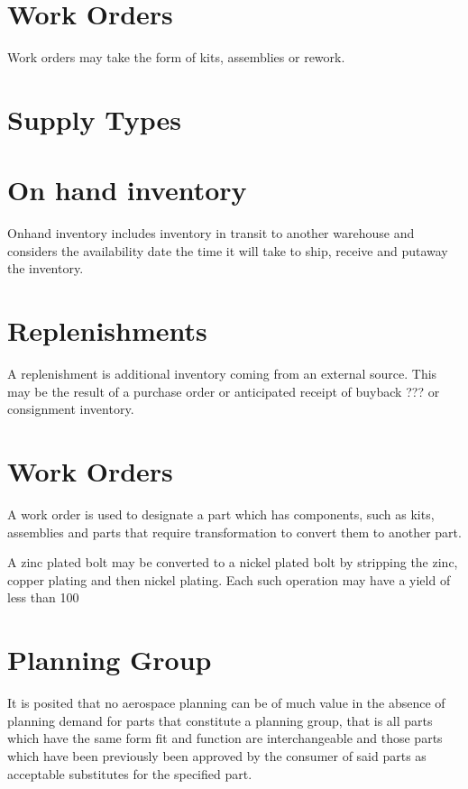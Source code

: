\documentclass[letterpaper,10pt,english]{sphinxmanual}
\begin{document}
\section{Work Orders}
\label{APS/ApsFeatures:work-orders}
Work orders may take the form of kits, assemblies or rework.


\section{Supply Types}
\label{APS/ApsFeatures:supply-types}

\section{On hand inventory}
\label{APS/ApsFeatures:on-hand-inventory}
Onhand inventory includes inventory in transit to another warehouse and
considers the availability date the time it will take to ship, receive
and putaway the inventory.


\section{Replenishments}
\label{APS/ApsFeatures:replenishments}
A replenishment is additional inventory coming from an external source.
This may be the result of a purchase order or anticipated receipt of
buyback ??? or consignment inventory.


\section{Work Orders}
\label{APS/ApsFeatures:id2}
A work order is used to designate a part which has components, such as
kits, assemblies and parts that require transformation to convert them
to another part.

A zinc plated bolt may be converted to a nickel plated bolt by stripping
the zinc, copper plating and then nickel plating. Each such operation
may have a yield of less than 100


\section{Planning Group}
\label{APS/ApsFeatures:planning-group}
It is posited that no aerospace planning can be of much value in the
absence of planning demand for parts that constitute a planning group,
that is all parts which have the same form fit and function are
interchangeable and those parts which have been previously been approved
by the consumer of said parts as acceptable substitutes for the
specified part.
\end{document}
